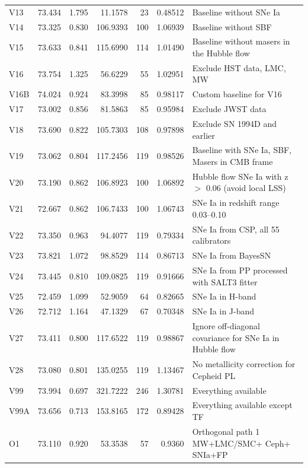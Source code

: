 \begin{table}
\begin{center}
\begin{tabular}{lccrrrl}
  V13 & 73.434 & 1.795 &  11.1578 &  23 & 0.48512 &   Baseline without SNe Ia \\
  V14 & 73.325 & 0.830 & 106.9393 & 100 & 1.06939 &   Baseline without SBF \\
  V15 & 73.633 & 0.841 & 115.6990 & 114 & 1.01490 &   Baseline without masers in the Hubble flow \\
  V16 & 73.754 & 1.325 &  56.6229 &  55 & 1.02951 &   Exclude HST data, LMC, MW \\
 V16B & 74.024 & 0.924 &  83.3998 &  85 & 0.98117 &   Custom baseline for V16 \\
  V17 & 73.002 & 0.856 &  81.5863 &  85 & 0.95984 &   Exclude JWST data \\
  V18 & 73.690 & 0.822 & 105.7303 & 108 & 0.97898 &   Exclude SN 1994D and earlier \\
  V19 & 73.062 & 0.804 & 117.2456 & 119 & 0.98526 &   Baseline with SNe Ia, SBF, Masers in CMB frame \\
  V20 & 73.190 & 0.862 & 106.8923 & 100 & 1.06892 &   Hubble flow SNe Ia with z $>$ 0.06 (avoid local LSS) \\
  V21 & 72.667 & 0.862 & 106.7433 & 100 & 1.06743 &   SNe Ia in redshift range 0.03--0.10  \\
  V22 & 73.350 & 0.963 &  94.4077 & 119 & 0.79334 &   SNe Ia from CSP, all 55 calibrators \\
  V23 & 73.821 & 1.072 &  98.8529 & 114 & 0.86713 &   SNe Ia from BayesSN \\
  V24 & 73.445 & 0.810 & 109.0825 & 119 & 0.91666 &   SNe Ia from PP processed with SALT3 fitter \\
  V25 & 72.459 & 1.099 &  52.9059 &  64 & 0.82665 &   SNe Ia in H-band \\
  V26 & 72.712 & 1.164 &  47.1329 &  67 & 0.70348 &   SNe Ia in J-band \\
  V27 & 73.411 & 0.800 & 117.6522 & 119 & 0.98867 &   Ignore off-diagonal covariance for SNe Ia in Hubble flow \\
  V28 & 73.080 & 0.801 & 135.0255 & 119 & 1.13467 &   No metallicity correction for Cepheid PL \\
  V99 & 73.994 & 0.697 & 321.7222 & 246 & 1.30781 &   Everything available \\
 V99A & 73.656 & 0.713 & 153.8165 & 172 & 0.89428 &   Everything available except TF \\
\hline
 O1 & 73.110 & 0.920 & 53.3538 & 57 & 0.9360 & %
                                  Orthogonal path 1 MW+LMC/SMC+
Ceph+
SNIa+FP \\ 

\end{tabular}
\end{center}
\end{table}

